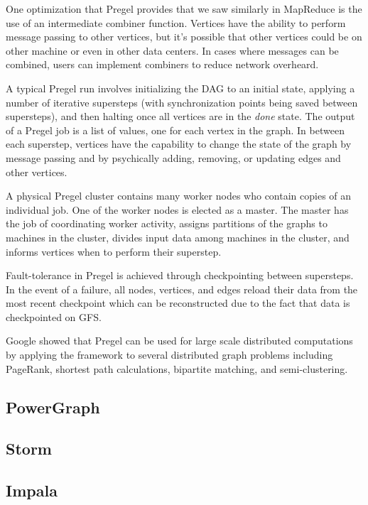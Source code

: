 \documentclass[]{article}
\begin{document}
One optimization that Pregel provides that we saw similarly in MapReduce is the use of an intermediate combiner function. Vertices have the ability to perform message passing to other vertices, but it's possible that other vertices could be on other machine or even in other data centers. In cases where messages can be combined, users can implement combiners to reduce network overheard.

A typical Pregel run involves initializing the DAG to an initial state, applying a number of iterative supersteps (with synchronization points being saved between supersteps), and then halting once all vertices are in the \textit{done} state. The output of a Pregel job is a list of values, one for each vertex in the graph. In between each superstep, vertices have the capability to change the state of the graph by message passing and by psychically adding, removing, or updating edges and other vertices.

A physical Pregel cluster contains many worker nodes who contain copies of an individual job. One of the worker nodes is elected as a master. The master has the job of coordinating worker activity, assigns partitions of the graphs to machines in the cluster, divides input data among machines in the cluster, and informs vertices when to perform their superstep.

Fault-tolerance in Pregel is achieved through checkpointing between supersteps. In the event of a failure, all nodes, vertices, and edges reload their data from the most recent checkpoint which can be reconstructed due to the fact that data is checkpointed on GFS. 

Google showed that Pregel can be used for large scale distributed computations by applying the framework to several distributed graph problems including PageRank, shortest path calculations, bipartite matching, and semi-clustering.


\subsection{PowerGraph}

\subsection{Storm}

\subsection{Impala}
\end{document}
